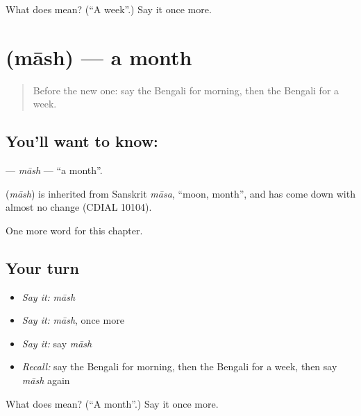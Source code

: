 \begin{tcolorbox}[breakable,colback=teal!4,colframe=teal!35!black,title={Before you move on}]
What does  mean? (\textquotedblleft{}A week\textquotedblright{}.) Say it once more.
\end{tcolorbox}
\section[\texorpdfstring{\bn{মাস} (māsh)}{মাস (māsh)}]{ (māsh) — a month}

\label{lesson:BN-C78-mash}



\begin{quote}
Before the new one: say the Bengali for morning, then the Bengali for a week.
\end{quote}

\subsection*{You'll want to know: }
\textbf{} — \emph{māsh} — \textquotedblleft{}a month\textquotedblright{}.

\begin{cousinweb}
\textbf{} (\emph{māsh}) is inherited from Sanskrit \emph{māsa}, \textquotedblleft{}moon, month\textquotedblright{}, and has come down with almost no change (CDIAL 10104).
\end{cousinweb}

\begin{grammarlens}[title={What you've built}]
One more word for this chapter.
\end{grammarlens}

\subsection*{Your turn}
\begin{itemize}
\raggedright
  \item \emph{Say it:} \emph{māsh}
  \item \emph{Say it:} \emph{māsh}, once more
  \item \emph{Say it:} say \emph{māsh}
  \item \emph{Recall:} say the Bengali for morning, then the Bengali for a week, then say \emph{māsh} again
\end{itemize}

\begin{tcolorbox}[breakable,colback=teal!4,colframe=teal!35!black,title={Before you move on}]
What does  mean? (\textquotedblleft{}A month\textquotedblright{}.) Say it once more.
\end{tcolorbox}
